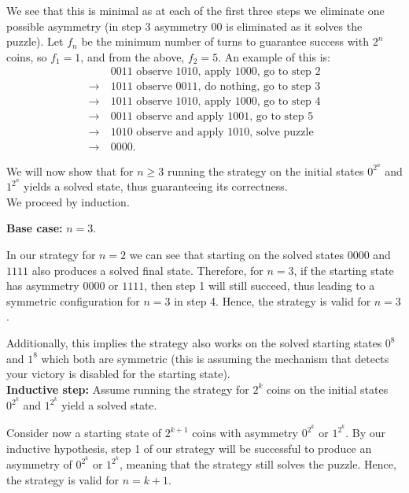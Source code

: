 \documentclass{article}
\begin{document}
    We see that this is minimal as at each of the first three steps we eliminate one possible  asymmetry (in step 3 asymmetry $00$ is eliminated as it solves the puzzle). Let $f_n$ be the minimum number of turns to guarantee success with $2^n$ coins, so $f_1 = 1$, and from the above, $\boxed{f_2 = 5}$. An example of this is:
    \begin{align*}
        &0011 \text{ observe 1010, apply 1000, go to step 2} \\
        \rightarrow\ &1011 \text{ observe 0011, do nothing, go to step 3} \\
        \rightarrow\ &1011 \text{ observe 1010, apply 1000, go to step 4} \\
        \rightarrow\ &0011 \text{ observe and apply 1001, go to step 5} \\
        \rightarrow\ &1010 \text{ observe and apply 1010, solve puzzle} \\
        \rightarrow\ &0000.
    \end{align*}

    We will now show that for $n\geq 3$ running the strategy on the initial states $0^{2^n}$ and $1^{2^n}$ yields a solved state, thus guaranteeing its correctness. \\

    We proceed by induction.
    
    \textbf{Base case:} $n = 3$.
    
    In our strategy for $n = 2$ we can see that starting on the solved states $0000$ and $1111$ also produces a solved final state. Therefore, for $n = 3$, if the starting state has asymmetry $0000$ or $1111$, then step 1 will still succeed, thus leading to a symmetric configuration for $n = 3$ in step 4. Hence, the strategy is valid for $n = 3$. 
    
    Additionally, this implies the strategy also works on the solved starting states $0^8$ and $1^8$ which both are symmetric (this is assuming the mechanism that detects your victory is disabled for the starting state). \\

    \textbf{Inductive step:} Assume running the strategy for $2^k$ coins on the initial states $0^{2^k}$ and $1^{2^k}$ yield a solved state.

    Consider now a starting state of $2^{k + 1}$ coins with asymmetry $0^{2^k}$ or $1^{2^k}$. By our inductive hypothesis, step 1 of our strategy will be successful to produce an asymmetry of $0^{2^k}$ or $1^{2^k}$, meaning that the strategy still solves the puzzle. Hence, the strategy is valid for $n = k + 1$.
\end{document}
